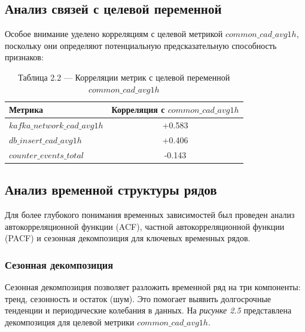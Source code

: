 \subsection{Анализ связей с целевой переменной}

\hspace*{1.25cm}Особое внимание уделено корреляциям с целевой метрикой $common\_cad\_avg1h$, поскольку они определяют потенциальную предсказательную способность признаков:

\begin{table}[H]
	\centering
	\caption*{Таблица 2.2 --- Корреляции метрик с целевой переменной $common\_cad\_avg1h$}
	\begin{tabular}{|l|c|}
		\hline
		\textbf{Метрика} & \textbf{Корреляция с $common\_cad\_avg1h$} \\
		\hline
		$kafka\_network\_cad\_avg1h$ & +0.583 \\
		$db\_insert\_cad\_avg1h$ & +0.406 \\
		$counter\_events\_total$ & -0.143 \\
		\hline
	\end{tabular}
	\label{tab:target_correlations}
\end{table}

\subsection{Анализ временной структуры рядов}

\hspace*{1.25cm}Для более глубокого понимания временных зависимостей был проведен анализ автокорреляционной функции (ACF), частной автокорреляционной функции (PACF) и сезонная декомпозиция для ключевых временных рядов.

\subsubsection{Сезонная декомпозиция}

\hspace*{1.25cm}Сезонная декомпозиция позволяет разложить временной ряд на три компоненты: тренд, сезонность и остаток (шум). Это помогает выявить долгосрочные тенденции и периодические колебания в данных. На \textit{рисунке 2.5} представлена декомпозиция для целевой метрики $common\_cad\_avg1h$.

